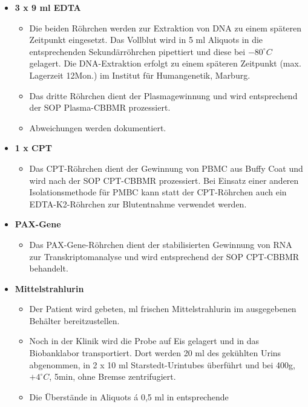 \begin{itemize}
  \item \textbf{3 x 9 ml EDTA}
    \begin{itemize}
      \item Die beiden Röhrchen werden zur Extraktion von DNA zu einem
        späteren Zeitpunkt eingesetzt. Das Vollblut wird in 5 ml
        Aliquots in die entsprechenden Sekundärröhrchen pipettiert und
        diese bei $-80^{\circ}C$ gelagert. Die DNA-Extraktion erfolgt zu einem
        späteren Zeitpunkt (max. Lagerzeit 12Mon.) im Institut für
        Humangenetik, Marburg.
      \item Das dritte Röhrchen dient der Plasmagewinnung und wird
        entsprechend der SOP Plasma-CBBMR prozessiert.
      \item Abweichungen werden dokumentiert.
    \end{itemize}
  \item \textbf{1 x CPT}
    \begin{itemize}
      \item Das CPT-Röhrchen dient der Gewinnung von PBMC aus Buffy
        Coat und wird nach der SOP CPT-CBBMR prozessiert. Bei Einsatz
        einer anderen Isolationsmethode für PMBC kann statt der
        CPT-Röhrchen auch ein EDTA-K2-Röhrchen zur Blutentnahme
        verwendet werden.
    \end{itemize}
  \item \textbf{PAX-Gene}
    \begin{itemize}
      \item Das PAX-Gene-Röhrchen dient der stabilisierten Gewinnung
        von RNA zur Transkriptomanalyse und wird entsprechend der SOP
        CPT-CBBMR behandelt.
    \end{itemize}
  \item \textbf{Mittelstrahlurin}
    \begin{itemize}
      \item Der Patient wird gebeten, ml frischen Mittelstrahlurin im
        ausgegebenen Behälter bereitzustellen.
      \item Noch in der Klinik wird die Probe auf Eis gelagert und in
        das Biobanklabor transportiert. Dort werden 20 ml des
        gekühlten Urins abgenommen, in 2 x 10 ml Starstedt-Urintubes
        überführt und bei 400g, $+4^{\circ}C$, 5min, ohne Bremse zentrifugiert.
      \item Die Überstände in Aliquots á 0,5 ml in entsprechende

\end{itemize}
\end{itemize}
